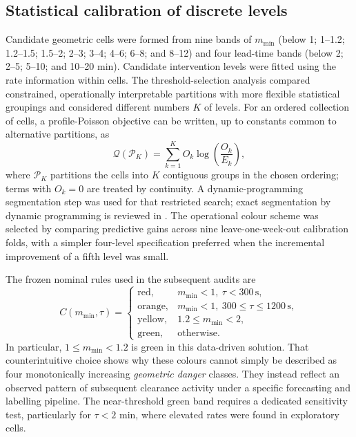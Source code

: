 \documentclass[pdflatex,sn-mathphys-num]{sn-jnl}
\newcommand{\mmin}{m_{\min}}
\begin{document}
\subsection{Statistical calibration of discrete levels}\label{sec:colors}
Candidate geometric cells were formed from nine bands of $\mmin$ (below 1; 1--1.2; 1.2--1.5; 1.5--2; 2--3; 3--4; 4--6; 6--8; and 8--12) and four lead-time bands (below 2; 2--5; 5--10; and 10--20 min). Candidate intervention levels were fitted using the rate information within cells. The threshold-selection analysis compared constrained, operationally interpretable partitions with more flexible statistical groupings and considered different numbers $K$ of levels. For an ordered collection of cells, a profile-Poisson objective can be written, up to constants common to alternative partitions, as
\begin{equation}\label{eq:partition}
 \mathcal{Q}(\mathcal{P}_K)=\sum_{k=1}^{K}O_k\log\!\left(\frac{O_k}{E_k}\right),
\end{equation}
where $\mathcal{P}_K$ partitions the cells into $K$ contiguous groups in the chosen ordering; terms with $O_k=0$ are treated by continuity. A dynamic-programming segmentation step was used for that restricted search; exact segmentation by dynamic programming is reviewed in \cite{killick2012}. The operational colour scheme was selected by comparing predictive gains across nine leave-one-week-out calibration folds, with a simpler four-level specification preferred when the incremental improvement of a fifth level was small.

The frozen nominal rules used in the subsequent audits are
\begin{equation}\label{eq:color}
 C(\mmin,\tau)=
 \begin{cases}
 \mathrm{red},& \mmin<1,\ \tau<300\,\mathrm{s},\\
 \mathrm{orange},& \mmin<1,\ 300\le\tau\le1200\,\mathrm{s},\\
 \mathrm{yellow},&1.2\le\mmin<2,\\
 \mathrm{green},&\text{otherwise}.
 \end{cases}
\end{equation}
In particular, $1\le\mmin<1.2$ is green in this data-driven solution. That counterintuitive choice shows why these colours cannot simply be described as four monotonically increasing \emph{geometric danger} classes. They instead reflect an observed pattern of subsequent clearance activity under a specific forecasting and labelling pipeline. The near-threshold green band requires a dedicated sensitivity test, particularly for $\tau<2$ min, where elevated rates were found in exploratory cells.
\end{document}

